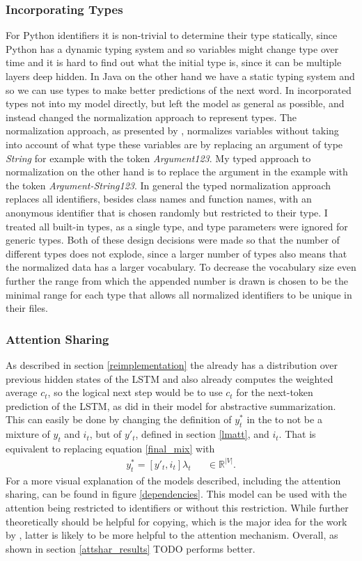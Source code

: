 \documentclass[11pt]{article}
\begin{document}
\subsubsection{Incorporating Types}
\label{incorporating_types}
For Python identifiers it is non-trivial to determine their type statically, since Python has a dynamic typing system and so variables might change type over time and it is hard to find out what the initial type is, since it can be multiple layers deep hidden.
In Java on the other hand we have a static typing system and so we can use types to make better predictions of the next word. In incorporated types not into my model directly, but left the model as general as possible, and instead changed the normalization approach to represent types.
The normalization approach, as presented by \cite{bhoopchand2016learning},  normalizes variables without taking into account of what type these variables are by replacing an argument of type \textit{String} for example with the token \textit{Argument123}. My typed approach to normalization on the other hand is to replace the argument in the example with the token \textit{Argument-String123}.
In general the typed normalization approach replaces all identifiers, besides class names and function names, with an anonymous identifier that is chosen randomly but restricted to their type. I treated all built-in types, as a single type, and type parameters were ignored for generic types. Both of these design decisions were made so that the number of different types does not explode, since a larger number of types also means that the normalized data has a larger vocabulary. To decrease the vocabulary size even further the range from which the appended number is drawn is chosen to be the minimal range for each type that allows all normalized identifiers to be unique in their files.

\subsubsection{Attention Sharing}
\label{attshar}
As described in section \ref{reimplementation} the \spn already has a distribution over previous hidden states of the LSTM and also already computes the weighted average $c_t$, so the logical next step would be to use $c_t$ for the next-token prediction of the LSTM, as \cite{See_2017} did in their model for abstractive summarization.
This can easily be done by changing the definition of $y^*_t$ in the \spn to not be a mixture of $y_t$ and $i_t$, but of $y'_t$, defined in section \ref{lmatt}, and $i_t$. That is equivalent to replacing equation \ref{final_mix} with
\begin{align}
	y^*_t = [y'_t, i_t]\lambda_t &&\in \mathbb{R}^{|V|}.
\end{align}
For a more visual explanation of the models described, including the attention sharing, can be found in figure \ref{dependencies}.
This model can be used with the attention being restricted to identifiers or without this restriction. While further theoretically should be helpful for copying, which is the major idea for the work by \cite{bhoopchand2016learning}, latter is likely to be more helpful to the attention mechanism. Overall, as shown in section \ref{attshar_results} TODO performs better.
\end{document}
